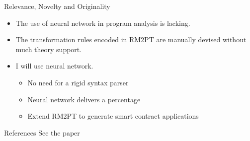 \documentclass[xcolor=svgnames]{beamer}
\begin{document}
\begin{frame}{Relevance, Novelty and Originality}
\begin{itemize}
\item The use of neural network in program analysis is lacking.
\item The transformation rules encoded in RM2PT are manually devised without much theory support.
\item I will use neural network.
\begin{itemize}
\item No need for a rigid syntax parser
\item Neural network delivers a percentage
\item Extend RM2PT to generate smart contract applications
\end{itemize}
\end{itemize}


\end{frame}




\begin{frame}{References}
See the paper
\end{frame}

%
\end{document}
